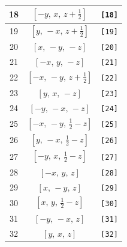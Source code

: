 \documentclass[fleqn,8pt]{jsarticle}
\begin{document}
\begin{longtable}{ccc}
18 & $\left[ - y,\, x,\, z + \frac{1}{2} \right]$ & {\tt [18]} \\ \hline
19 & $\left[ y,\, - x,\, z + \frac{1}{2} \right]$ & {\tt [19]} \\ \hline
20 & $\left[ x,\, - y,\, - z \right]$ & {\tt [20]} \\ \hline
21 & $\left[ - x,\, y,\, - z \right]$ & {\tt [21]} \\ \hline
22 & $\left[ - x,\, - y,\, z + \frac{1}{2} \right]$ & {\tt [22]} \\ \hline
23 & $\left[ y,\, x,\, - z \right]$ & {\tt [23]} \\ \hline
24 & $\left[ - y,\, - x,\, - z \right]$ & {\tt [24]} \\ \hline
25 & $\left[ - x,\, - y,\, \frac{1}{2} - z \right]$ & {\tt [25]} \\ \hline
26 & $\left[ y,\, - x,\, \frac{1}{2} - z \right]$ & {\tt [26]} \\ \hline
27 & $\left[ - y,\, x,\, \frac{1}{2} - z \right]$ & {\tt [27]} \\ \hline
28 & $\left[ - x,\, y,\, z \right]$ & {\tt [28]} \\ \hline
29 & $\left[ x,\, - y,\, z \right]$ & {\tt [29]} \\ \hline
30 & $\left[ x,\, y,\, \frac{1}{2} - z \right]$ & {\tt [30]} \\ \hline
31 & $\left[ - y,\, - x,\, z \right]$ & {\tt [31]} \\ \hline
32 & $\left[ y,\, x,\, z \right]$ & {\tt [32]} \\
\end{longtable}
\end{document}
